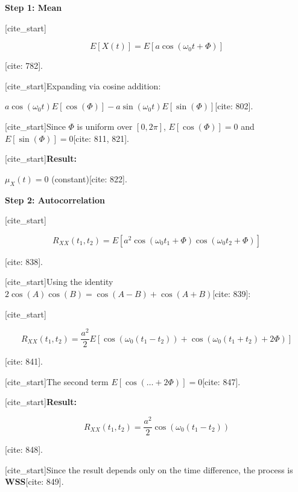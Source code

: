 \documentclass{article}
\begin{document}
\textbf{Step 1: Mean}

[cite\_start]

\[
E[X(t)] = E[a \cos(\omega_0 t + \Phi)]
\]

[cite: 782].

[cite\_start]Expanding via cosine addition:

$a \cos(\omega_0 t) E[\cos(\Phi)] - a \sin(\omega_0 t) E[\sin(\Phi)]$[cite: 802].

[cite\_start]Since $\Phi$ is uniform over $[0, 2\pi]$, $E[\cos(\Phi)] = 0$ and $E[\sin(\Phi)] = 0$[cite: 811, 821].

[cite\_start]\textbf{Result:}

$\mu_X(t) = 0$ (constant)[cite: 822].

\textbf{Step 2: Autocorrelation}

[cite\_start]

\[
R_{XX}(t_1, t_2)
=
E[
a^2
\cos(\omega_0 t_1 + \Phi)
\cos(\omega_0 t_2 + \Phi)
]
\]

[cite: 838].

[cite\_start]Using the identity $2\cos(A)\cos(B) = \cos(A-B) + \cos(A+B)$[cite: 839]:

[cite\_start]

\[
R_{XX}(t_1, t_2)
=
\frac{a^2}{2}
E[
\cos(\omega_0(t_1 - t_2))
+
\cos(\omega_0(t_1 + t_2) + 2\Phi)
]
\]

[cite: 841].

[cite\_start]The second term $E[\cos(\dots + 2\Phi)] = 0$[cite: 847].

[cite\_start]\textbf{Result:}

\[
R_{XX}(t_1, t_2)
=
\frac{a^2}{2}
\cos(\omega_0(t_1 - t_2))
\]

[cite: 848].

[cite\_start]Since the result depends only on the time difference, the process is \textbf{WSS}[cite: 849].
\end{document}
